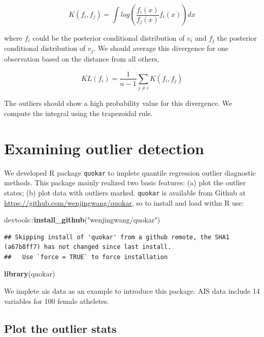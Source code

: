 \documentclass[11pt,a4paper,]{article}
\newenvironment{Shaded}{\begin{snugshade}}{\end{snugshade}}
\newcommand{\KeywordTok}[1]{\textcolor[rgb]{0.13,0.29,0.53}{\textbf{{#1}}}}
\newcommand{\StringTok}[1]{\textcolor[rgb]{0.31,0.60,0.02}{{#1}}}
\newcommand{\NormalTok}[1]{{#1}}
\theoremstyle{definition}
\theoremstyle{definition}
\theoremstyle{remark}
\begin{document}
\[K(f_i, f_j)=\int log(\frac{f_i(x)}{f_j(x)}f_{i}(x))dx\]

where \(f_i\) could be the posterior conditional distribution of \(v_i\)
and \(f_j\) the posterior conditional distribution of \(v_j\). We should
average this divergence for one observation based on the distance from
all others,

\[KL(f_i)=\frac{1}{n-1}\sum_{j\neq i}K(f_i, f_j)\]

The outliers should show a high probability value for this divergence.
We compute the integral using the trapezoidal rule.

\section{Examining outlier detection}\label{examining-outlier-detection}

We developed R package \texttt{quokar} to implete quantile regression
outlier diagnostic methods. This package mainly realized two basic
features: (a) plot the outlier states; (b) plot data with outliers
marked. \texttt{quokar} is available from Github at
\url{https://github.com/wenjingwang/quokar}, so to install and load
withn R use:

\begin{Shaded}
\begin{Highlighting}[]
\NormalTok{devtools::}\KeywordTok{install_github}\NormalTok{(}\StringTok{"wenjingwang/quokar"}\NormalTok{)}
\end{Highlighting}
\end{Shaded}

\begin{verbatim}
## Skipping install of 'quokar' from a github remote, the SHA1 (a67b8ff7) has not changed since last install.
##   Use `force = TRUE` to force installation
\end{verbatim}

\begin{Shaded}
\begin{Highlighting}[]
\KeywordTok{library}\NormalTok{(quokar)}
\end{Highlighting}
\end{Shaded}

We implete ais data as an example to introduce this package. AIS data
include 14 variables for 100 female atheletes.

\subsection{Plot the outlier stats}\label{plot-the-outlier-stats}
\end{document}
